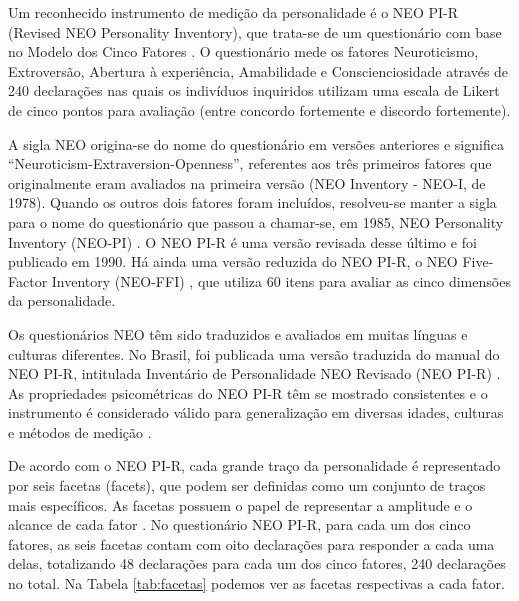 
Um reconhecido instrumento de medição da personalidade é o NEO PI-R (Revised NEO Personality Inventory), que trata-se de um questionário com base no Modelo dos Cinco Fatores \cite{costa:92a}. O questionário mede os fatores Neuroticismo, Extroversão, Abertura à experiência, Amabilidade e Conscienciosidade através de 240 declarações nas quais os indivíduos inquiridos utilizam uma escala de Likert de cinco pontos para avaliação (entre concordo fortemente e discordo fortemente).

A sigla NEO origina-se do nome do questionário em versões anteriores e significa ``Neuroticism-Extraversion-Openness'', referentes aos três primeiros fatores que originalmente eram avaliados na primeira versão (NEO Inventory - NEO-I, de 1978). Quando os outros dois fatores foram incluídos, resolveu-se manter a sigla para o nome do questionário que passou a chamar-se, em 1985, NEO Personality Inventory (NEO-PI) \cite{costa:85}. O NEO PI-R é uma versão revisada desse último e foi publicado em 1990. Há ainda uma versão reduzida do NEO PI-R, o NEO Five-Factor Inventory (NEO-FFI) \cite{costa:92b}, que utiliza 60 itens para avaliar as cinco dimensões da personalidade.

Os questionários NEO têm sido traduzidos e avaliados em muitas línguas e culturas diferentes. No Brasil, foi publicada uma versão traduzida do manual do NEO PI-R, intitulada Inventário de Personalidade NEO Revisado (NEO PI-R) \cite{flores:07}. As propriedades psicométricas do NEO PI-R têm se mostrado consistentes e o instrumento é considerado válido para generalização em diversas idades, culturas e métodos de medição \cite{mccrae:11}.

De acordo com o NEO PI-R, cada grande traço da personalidade é representado por seis facetas (facets), que podem ser definidas como um conjunto de traços mais específicos. As facetas possuem o papel de representar a amplitude e o alcance de cada fator \cite{mccrae:06}. No questionário NEO PI-R, para cada um dos cinco fatores, as seis facetas contam com oito declarações para responder a cada uma delas, totalizando 48 declarações para cada um dos cinco fatores, 240 declarações no total. Na Tabela \ref{tab:facetas} podemos ver as facetas respectivas a cada fator.


